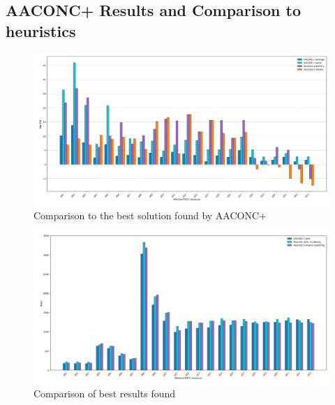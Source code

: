 \documentclass{article}
\begin{document}
	
	
	
	\clearpage
	\subsection{AACONC+ Results and Comparison to heuristics}
	\;
	\;
	\captionsetup{justification=centering}  %
	\begin{figure}[h!]
		\centering
		\caption{Comparison to the best solution found by AACONC+}
		\includegraphics[width=\textwidth]{gaps_to_aco_best}
	\end{figure}
	\begin{figure}[h!]
		\centering
		\caption{Comparison of best results found}
		\includegraphics[width=\textwidth]{best_results_comp_barGraph}
	\end{figure}
\end{document}
